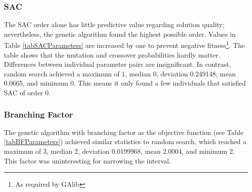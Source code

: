 \pagebreak
\subsubsection{SAC} %
The SAC order alone has little predictive value regarding solution quality; nevertheless,
the genetic algorithm found the highest possible order. Values in Table \ref{tabSACParameters} are increased
by one to prevent negative fitness\footnote{As required by GAlib}.
The table shows that the mutation and crossover probabilities
hardly matter. Differences between individual parameter pairs are insignificant.
In contrast, random search achieved a maximum of 1, median 0, deviation 0.249148,
mean 0.0665, and minimum 0. This means it only found a few individuals that satisfied SAC of order 0.

\subsubsection{Branching Factor} %
The genetic algorithm with branching factor as the objective function (see Table \ref{tabBFParameters})
achieved similar statistics to random search, which
reached a maximum of 3, median 2, deviation 0.0199968, mean 2.0004, and minimum 2.
This factor was uninteresting for narrowing the interval.

